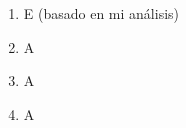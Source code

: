 \documentclass[12pt, a4paper]{article}
\newcommand{\respitem}[1]{\item[\textbf{#1.}]} %
\begin{document}
\begin{enumerate}
    \respitem{26} E (basado en mi análisis)
    \respitem{27} A %
    \respitem{27} A
    \respitem{28} A %

\end{enumerate}
\end{document}
